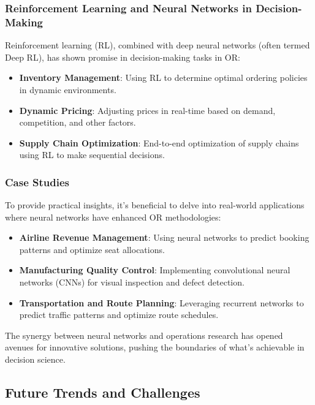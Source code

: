 \subsubsection{Reinforcement Learning and Neural Networks in Decision-Making}

Reinforcement learning (RL), combined with deep neural networks (often termed Deep RL), has shown promise in decision-making tasks in OR:

\begin{itemize}
    \item \textbf{Inventory Management}: Using RL to determine optimal ordering policies in dynamic environments.
    \item \textbf{Dynamic Pricing}: Adjusting prices in real-time based on demand, competition, and other factors.
    \item \textbf{Supply Chain Optimization}: End-to-end optimization of supply chains using RL to make sequential decisions.
\end{itemize}

\subsubsection{Case Studies}

To provide practical insights, it's beneficial to delve into real-world applications where neural networks have enhanced OR methodologies:

\begin{itemize}
    \item \textbf{Airline Revenue Management}: Using neural networks to predict booking patterns and optimize seat allocations.
    \item \textbf{Manufacturing Quality Control}: Implementing convolutional neural networks (CNNs) for visual inspection and defect detection.
    \item \textbf{Transportation and Route Planning}: Leveraging recurrent networks to predict traffic patterns and optimize route schedules.
\end{itemize}

The synergy between neural networks and operations research has opened avenues for innovative solutions, pushing the boundaries of what's achievable in decision science.

\subsection{Future Trends and Challenges}


